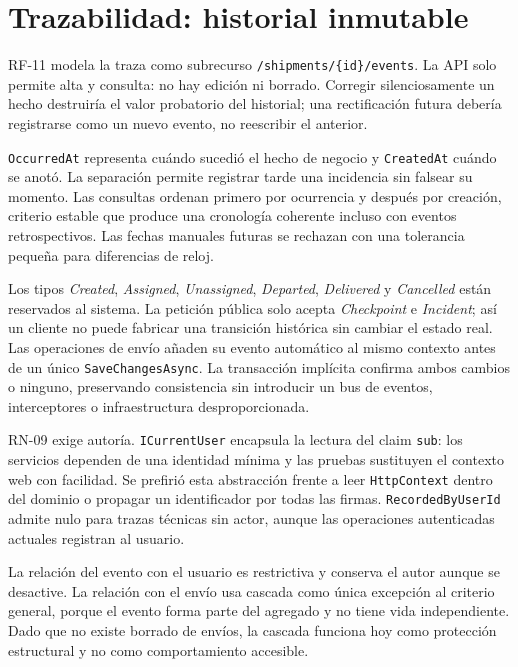 \section{Trazabilidad: historial inmutable}

RF-11 modela la traza como subrecurso \texttt{/shipments/\{id\}/events}. La API solo permite alta y consulta: no hay edición ni borrado. Corregir silenciosamente un hecho destruiría el valor probatorio del historial; una rectificación futura debería registrarse como un nuevo evento, no reescribir el anterior.

\texttt{OccurredAt} representa cuándo sucedió el hecho de negocio y \texttt{CreatedAt} cuándo se anotó. La separación permite registrar tarde una incidencia sin falsear su momento. Las consultas ordenan primero por ocurrencia y después por creación, criterio estable que produce una cronología coherente incluso con eventos retrospectivos. Las fechas manuales futuras se rechazan con una tolerancia pequeña para diferencias de reloj.

Los tipos \emph{Created}, \emph{Assigned}, \emph{Unassigned}, \emph{Departed}, \emph{Delivered} y \emph{Cancelled} están reservados al sistema. La petición pública solo acepta \emph{Checkpoint} e \emph{Incident}; así un cliente no puede fabricar una transición histórica sin cambiar el estado real. Las operaciones de envío añaden su evento automático al mismo contexto antes de un único \texttt{SaveChangesAsync}. La transacción implícita confirma ambos cambios o ninguno, preservando consistencia sin introducir un bus de eventos, interceptores o infraestructura desproporcionada.

RN-09 exige autoría. \texttt{ICurrentUser} encapsula la lectura del claim \texttt{sub}: los servicios dependen de una identidad mínima y las pruebas sustituyen el contexto web con facilidad. Se prefirió esta abstracción frente a leer \texttt{HttpContext} dentro del dominio o propagar un identificador por todas las firmas. \texttt{RecordedByUserId} admite nulo para trazas técnicas sin actor, aunque las operaciones autenticadas actuales registran al usuario.

La relación del evento con el usuario es restrictiva y conserva el autor aunque se desactive. La relación con el envío usa cascada como única excepción al criterio general, porque el evento forma parte del agregado y no tiene vida independiente. Dado que no existe borrado de envíos, la cascada funciona hoy como protección estructural y no como comportamiento accesible.

